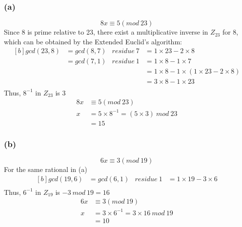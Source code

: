 \documentclass[11pt]{article}
\begin{document}
\subsubsection*{(a)}
$$8x\equiv 5(mod\ 23)$$
Since 8 is prime relative to 23, there exist a multiplicative inverse in $Z_{23}$ for $8$, which can be obtained by the Extended Euclid's algorithm:
\begin{equation}
\begin{aligned}[b]
gcd(23,8)	&=gcd(8,7)	&residue\ 7	&= 1\times 23-2\times 8\\
			&=gcd(7,1)	&residue\ 1	&= 1\times 8 -1\times 7\\
			&			&		   	&= 1\times 8 -1\times (1\times 23-2\times 8)\\
			&			&			&= 3\times 8 -1\times 23\\
\end{aligned}
\end{equation}
Thus, $8^{-1}$ in $Z_{23}$ is 3
\begin{equation}
\begin{split}
8x&\equiv 5(mod\ 23)\\
x&= 5\times 8^{-1}=(5\times 3)\ mod\ 23\\
&=15
\end{split}
\end{equation}

\subsubsection*{(b)}
$$6x\equiv 3(mod\ 19)$$
For the same rational in (a)\\
\begin{equation}
\begin{aligned}[b]
gcd(19,6)	&=gcd(6,1)	&residue\ 1	&= 1\times 19-3\times 6\\
\end{aligned}
\end{equation}
Thus, $6^{-1}$ in $Z_{19}$ is $-3\ mod\ 19=16$
\begin{equation}
\begin{split}
6x&\equiv 3(mod\ 19)\\
x&=3\times 6^{-1}=3\times 16\ mod\ 19\\
&=10
\end{split}
\end{equation}
	
\end{document}

